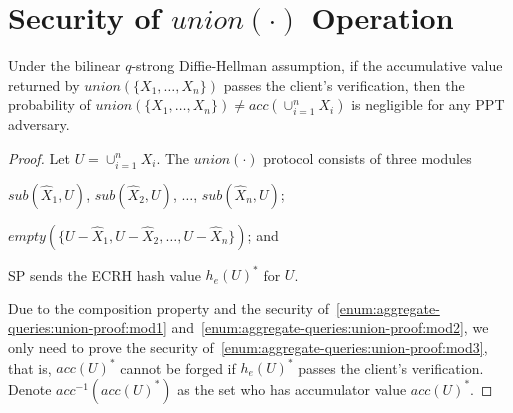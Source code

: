 \section{Security of $union(\cdot)$ Operation}

\begin{lemma}\label{lem:aggregate-queries:union}
  Under the bilinear $q$-strong Diffie-Hellman assumption, if the accumulative value returned by $union(\{X_1,\dots,X_n\})$ passes the client's verification, then the probability of $union(\{X_1,\dots,X_n\}) \neq acc(\cup_{i=1}^n X_i)$ is negligible for any PPT adversary.
\end{lemma}
\begin{proof}
  Let $U = \cup_{i=1}^n X_i$. The $union(\cdot)$ protocol consists of three modules
  \begin{inlineenum}
  \item $sub(\widehat{X}_1, U)$, $sub(\widehat{X}_2, U)$, $\dots$, $sub(\widehat{X}_n, U)$;%
    \label{enum:aggregate-queries:union-proof:mod1}
  \item $empty(\{U-\widehat{X}_1, U-\widehat{X}_2, \dots, U -\widehat{X}_n\})$; and%
    \label{enum:aggregate-queries:union-proof:mod2}
  \item SP sends the ECRH hash value ${h_e(U)}^*$ for $U$.%
    \label{enum:aggregate-queries:union-proof:mod3}
  \end{inlineenum}
  Due to the composition property and the security of~\ref{enum:aggregate-queries:union-proof:mod1} and~\ref{enum:aggregate-queries:union-proof:mod2}, we only need to prove the security of~\ref{enum:aggregate-queries:union-proof:mod3}, that is, ${acc(U)}^*$ cannot be forged if ${h_e(U)}^*$ passes the client's verification. Denote $acc^{-1}({acc(U)}^*)$ as the set who has accumulator value ${acc(U)}^*$.


\end{proof}
